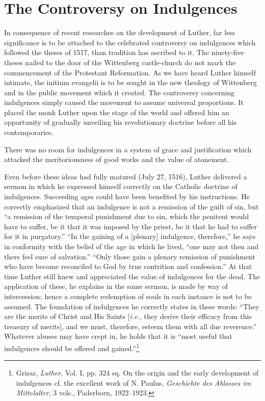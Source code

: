 \section{The Controversy on Indulgences}

In consequence of recent researches on the development of Luther,
far less significance is to be attached to the celebrated controversy
on indulgences which followed the theses of 1517, than tradition
has ascribed to it. The ninety-five theses nailed to the door of the
Wittenberg castle-church do not mark the commencement of the
Protestant Reformation. As we have heard Luther himself intimate,
the initium evangelii is to be sought in the new theology of Wittenberg
and in the public movement which it created. The controversy
concerning indulgences simply caused the movement to assume universal proportions.
It placed the monk Luther upon the stage of
the world and offered him an opportunity of gradually unveiling
his revolutionary doctrine before all his contemporaries.

There was no room for indulgences in a system of grace and
justification which attacked the meritoriousness of good works and
the value of atonement.

Even before these ideas had fully matured (July 27, 1516), Luther
delivered a sermon in which he expressed himself correctly on the
Catholic doctrine of indulgences. Succeeding ages could have been
benefited by his instructions. He correctly emphasized that an indulgence
is not a remission of the guilt of sin, but “a remission of
the temporal punishment due to sin, which the penitent would have
to suffer, be it that it was imposed by the priest, be it that he had
to suffer for it in purgatory.” “In the gaining of a [plenary] indulgence,
therefore,” he says in conformity with the belief of the
age in which he lived, “one may not then and there feel sure of
salvation.” “Only those gain a plenary remission of punishment who
have become reconciled to God by true contrition and confession.”
At that time Luther still knew and appreciated the value of indulgences
for the dead. The application of these, he explains in the same
sermon, is made by way of intercession; hence a complete redemption of
souls in each instance is not to be assumed. The foundation
of indulgences he correctly states in these words: “They are the
merits of Christ and His Saints [\textit{i.e.}, they derive their efficacy from
this treasury of merits], and we must, therefore, esteem them with
all due reverence.” Whatever abuses may have crept in, he holds
that it is “most useful that indulgences should be offered and
gained.”\footnote
{Grisar, \textit{Luther}, Vol. I, pp. 324 sq. On the origin and the early development of indulgences
cf. the excellent work of N. Paulus, \textit{Geschichte des Ablasses im Mittelalter}, 3 vols.,
Paderborn, 1922--1923.}

